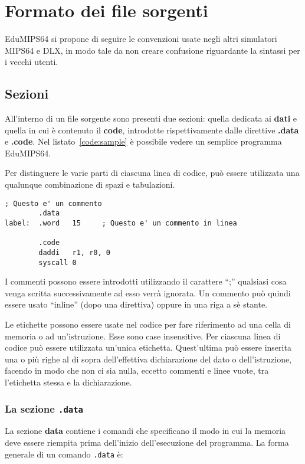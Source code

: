\documentclass[12pt]{report}
\newcommand{\EM}{EduMIPS64}
\newcommand{\MS}{MIPS64}
\begin{document}
\chapter{Formato dei file sorgenti}
\EM{} si propone di seguire le convenzioni usate negli altri simulatori \MS{} e DLX, 
in modo tale da non creare confusione riguardante la sintassi per i vecchi utenti.

\section{Sezioni}
All'interno di un file sorgente sono presenti due sezioni: quella dedicata ai \textbf{dati} 
e quella in cui \`{e} contenuto il \textbf{code}, introdotte rispettivamente dalle direttive \textbf{.data} e
\textbf{.code}. Nel listato~\ref{code:sample} \`{e} possibile vedere un semplice programma 
\EM{}.

Per distinguere le varie parti di ciascuna linea di codice, pu\`{o} essere utilizzata una qualunque combinazione di spazi e tabulazioni.

\begin{lstlisting}[caption={Esempio di codice \EM{}}, label={code:sample}, style={mips}]
; Questo e' un commento
        .data
label:  .word   15     ; Questo e' un commento in linea

        .code
        daddi   r1, r0, 0
        syscall 0
\end{lstlisting}

\index{;}
I commenti possono essere introdotti utilizzando il carattere ``;'' qualsiasi
cosa venga scritta successivamente ad esso verr\`{a} ignorata.  Un commento
pu\`{o} quindi essere usato ``inline'' (dopo una direttiva) oppure in una riga a
s\`{e} stante.

 Le etichette possono essere usate nel codice per fare
riferimento ad una cella di memoria o ad un'istruzione.  Esse sono case
insensitive. Per ciascuna linea di codice pu\`{o} essere utilizzata un'unica
etichetta. Quest'ultima pu\`{o} essere inserita una o pi\`{u} righe al di sopra
dell'effettiva dichiarazione del dato o dell'istruzione, facendo in modo che non
ci sia nulla, eccetto commenti e linee vuote, tra l'etichetta stessa e la
dichiarazione. 

\subsection{La sezione \texttt{.data}}
La sezione \textbf{data} contiene i comandi che specificano il modo in cui la
memoria deve essere riempita prima dell'inizio dell'esecuzione del programma. La
forma generale di un comando \texttt{.data} \`{e}:
\end{document}
